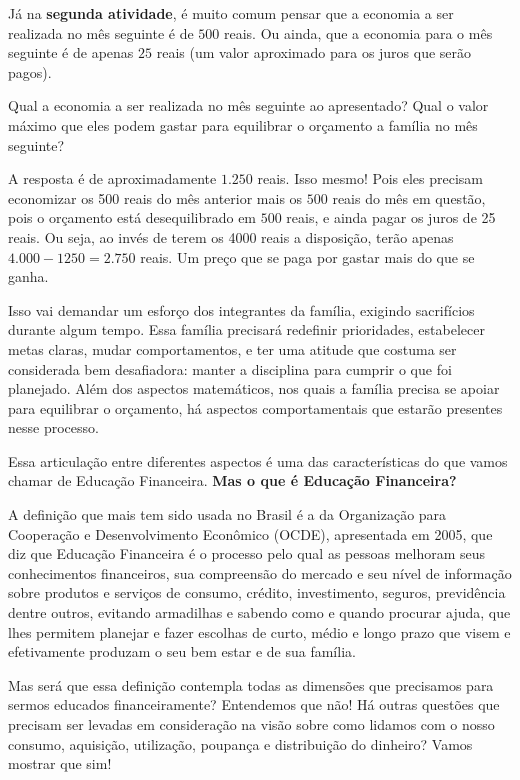Já na \textbf{segunda atividade}, é muito comum pensar que a economia a ser realizada no mês seguinte é de $500$ reais. Ou ainda, que a economia para o mês seguinte é de apenas $25$ reais (um valor aproximado para os juros que serão pagos). 


Qual a economia a ser realizada no mês seguinte ao apresentado? Qual o valor máximo que eles podem gastar para equilibrar o orçamento a família no mês seguinte? 

A resposta é de aproximadamente $1.250$ reais. Isso mesmo! Pois eles precisam economizar os 500 reais do mês anterior mais os $500$ reais do mês em questão, pois o orçamento está desequilibrado em $500$ reais, e ainda pagar os juros de 25 reais. Ou seja, ao invés de terem os 4000 reais a disposição, terão apenas $4.000 - 1250 = 2.750$ reais. Um preço que se paga por gastar mais do que se ganha.

Isso vai demandar um esforço dos integrantes da família, exigindo sacrifícios durante algum tempo. Essa família precisará redefinir prioridades, estabelecer metas claras, mudar comportamentos, e ter uma atitude que costuma ser considerada bem desafiadora: manter a disciplina para cumprir o que foi planejado. Além dos aspectos matemáticos, nos quais a família precisa se apoiar para equilibrar o orçamento, há aspectos comportamentais que estarão presentes nesse processo.

Essa articulação entre diferentes aspectos é uma das características do que vamos chamar de Educação Financeira. \textbf{Mas o que é Educação Financeira?}

A definição que mais tem sido usada no Brasil é a da Organização para Cooperação e Desenvolvimento Econômico (OCDE), apresentada em 2005, que diz que Educação Financeira é o processo pelo qual as pessoas melhoram seus conhecimentos financeiros, sua compreensão do mercado e seu nível de informação sobre produtos e serviços de consumo, crédito, investimento, seguros, previdência dentre outros, evitando armadilhas e sabendo como e quando procurar ajuda, que lhes permitem planejar e fazer escolhas de curto, médio e longo prazo que visem e efetivamente produzam o seu bem estar e de sua família.

Mas será que essa definição contempla todas as dimensões que precisamos para sermos educados financeiramente? Entendemos que não! Há outras questões que precisam ser levadas em consideração na visão sobre como lidamos com o nosso consumo, aquisição, utilização, poupança e distribuição do dinheiro? Vamos mostrar que sim!


